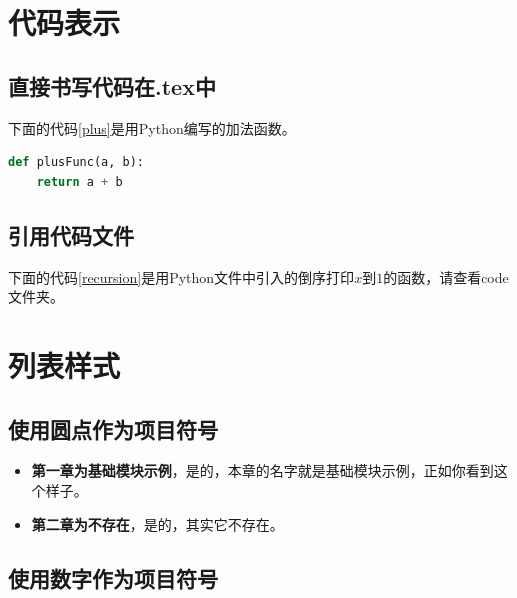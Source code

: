 \documentclass[a4paper,AutoFakeBold,oneside,12pt]{book}
\begin{document}
\section{代码表示}


\subsection{直接书写代码在.tex中}
下面的代码\ref{plus}是用Python编写的加法函数。

\begin{lstlisting}[language=Python, caption=加法, label=plus, tabsize=2]  
def plusFunc(a, b):
	return a + b 
\end{lstlisting}  

\subsection{引用代码文件}
下面的代码\ref{recursion}是用Python文件中引入的倒序打印$x$到$1$的函数，请查看code文件夹。



\section{列表样式}

\subsection{使用圆点作为项目符号}

\begin{itemize}
\item \textbf{第一章为基础模块示例}，是的，本章的名字就是基础模块示例，正如你看到这个样子。
\item \textbf{第二章为不存在}，是的，其实它不存在。
\end{itemize}

\subsection{使用数字作为项目符号}
\end{document}
